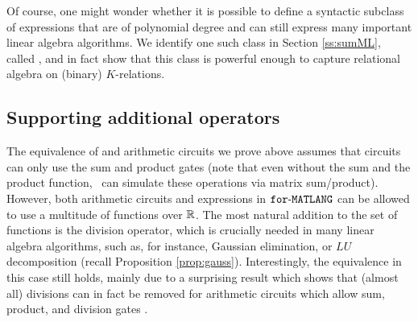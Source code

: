 
Of course, one might wonder whether it is possible to define a syntactic subclass of \langfor expressions that are of polynomial degree and can still express many important linear algebra algorithms. We identify one such class in Section \ref{ss:sumML}, called \langsum, and in fact show that this class is powerful enough to capture relational algebra on (binary) $K$-relations. 



\subsection{Supporting additional operators}

%
%
%

The equivalence of \langfor and arithmetic circuits we prove above assumes that circuits can only use the sum and product gates (note that even without the sum and the product function, \langfor\ can simulate these operations via matrix sum/product). However, both arithmetic circuits and expressions in $\texttt{for}\text{-}\texttt{MATLANG}$ can be allowed to use a multitude of functions over $\mathbb{R}$. The most natural addition to the set of functions is the division operator, which is crucially needed in many linear algebra algorithms, such as, for instance, Gaussian elimination, or $LU$ decomposition (recall Proposition \ref{prop:gauss}).
Interestingly, the equivalence in this case still holds, mainly due to a surprising result which shows that (almost all) divisions can in fact be removed for arithmetic circuits which allow sum, product, and division gates \cite{allender}.

